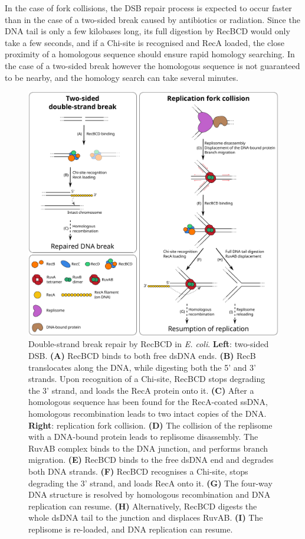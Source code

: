 In the case of fork collisions, the DSB repair process is expected to occur faster than in the case of a two-sided break caused by antibiotics or radiation. Since the DNA tail is only a few kilobases long, its full digestion by RecBCD would only take a few seconds, and if a Chi-site is recognised and RecA loaded, the close proximity of a homologous sequence should ensure rapid homology searching. In the case of a two-sided break however the homologous sequence is not guaranteed to be nearby, and the homology search can take several minutes.\cite{Wiktor2021}

\begin{figure}[htbp]
    \centering
    \includegraphics[width=.8\textwidth]{Figures/DSB_scheme.pdf}
    \caption{Double-strand break repair by RecBCD in \emph{E. coli}. \textbf{Left}: two-sided DSB. \textbf{(A)} RecBCD binds to both free dsDNA ends. \textbf{(B)} RecB translocates along the DNA, while digesting both the 5' and 3' strands. Upon recognition of a Chi-site, RecBCD stops degrading the 3' strand, and loads the RecA protein onto it. \textbf{(C)} After a homologous sequence has been found for the RecA-coated ssDNA, homologous recombination leads to two intact copies of the DNA. \textbf{Right}: replication fork collision. \textbf{(D)} The collision of the replisome with a DNA-bound protein leads to replisome disassembly. The RuvAB complex binds to the DNA junction, and performs branch migration. \textbf{(E)} RecBCD binds to the free dsDNA end and degrades both DNA strands. \textbf{(F)} RecBCD recognises a Chi-site, stops degrading the 3' strand, and loads RecA onto it. \textbf{(G)} The four-way DNA structure is resolved by homologous recombination and DNA replication can resume. \textbf{(H)} Alternatively, RecBCD digests the whole dsDNA tail to the junction and displaces RuvAB. \textbf{(I)} The replisome is re-loaded, and DNA replication can resume.}
    \label{Fig:DSB_scheme}
\end{figure}

